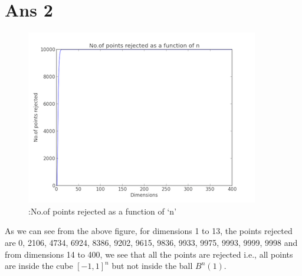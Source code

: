 \documentclass[10pt]{article}
\begin{document}
\section*{Ans 2}
\begin{flushleft}
\begin{figure}[!htb]
\includegraphics{2.png}
\caption{:No.of points rejected as a function of `n'}
\end{figure}
As we can see from the above figure, for dimensions 1 to 13, the points rejected are 0, 2106, 4734, 6924, 8386, 9202, 9615, 9836, 9933, 9975, 9993, 9999, 9998 and from dimensions 14 to 400, we see that all the points are rejected i.e., all points are inside the cube $[-1, 1]^{n}$ but not inside the ball $B^{n}(1)$.
\end{flushleft}
\vspace{10em}
\end{document}
